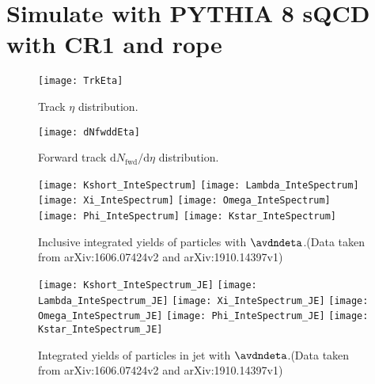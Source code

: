 
\section{Simulate with PYTHIA 8 sQCD with CR1 and rope}%
\label{sec:CRorRope}

\begin{figure}[t]
        \begin{center}
                \texttt{[image: TrkEta]}
        \end{center}
        \caption{Track $\eta$ distribution.}
        \label{fig:TrkEta}
\end{figure}

\begin{figure}[t]
	\begin{center}
		\texttt{[image: dNfwddEta]}
	\end{center}
	\caption{Forward track $\mathrm{d}N_\mathrm{fwd}/\mathrm{d}\eta$ distribution.}
	\label{fig:TrkdNdEta}
\end{figure}

\begin{figure}[ht]
	\begin{center}
		\texttt{[image: Kshort\_InteSpectrum]}
		\texttt{[image: Lambda\_InteSpectrum]}
		\texttt{[image: Xi\_InteSpectrum]}
		\texttt{[image: Omega\_InteSpectrum]}
		\texttt{[image: Phi\_InteSpectrum]}
		\texttt{[image: Kstar\_InteSpectrum]}
	\end{center}
	\caption{Inclusive integrated yields of particles with $\avdndeta$.(Data taken from arXiv:1606.07424v2 and arXiv:1910.14397v1)}
	\label{fig:InclIntePar}
\end{figure}
\begin{figure}[ht]
	\begin{center}
		\texttt{[image: Kshort\_InteSpectrum\_JE]}
		\texttt{[image: Lambda\_InteSpectrum\_JE]}
		\texttt{[image: Xi\_InteSpectrum\_JE]}
		\texttt{[image: Omega\_InteSpectrum\_JE]}
		\texttt{[image: Phi\_InteSpectrum\_JE]}
		\texttt{[image: Kstar\_InteSpectrum\_JE]}
	\end{center}
	\caption{Integrated yields of particles in jet with $\avdndeta$.(Data taken from arXiv:1606.07424v2 and arXiv:1910.14397v1)}
	\label{fig:JCIntePar}
\end{figure}

